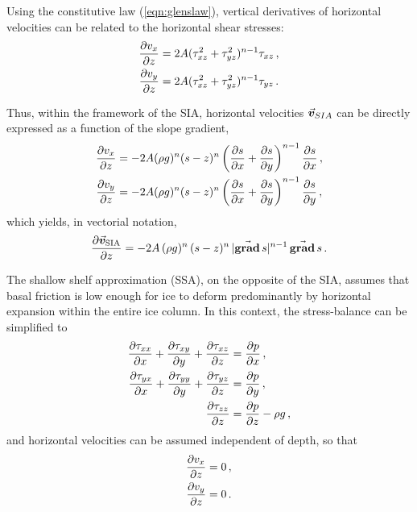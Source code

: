 \documentclass{article}
\newcommand{\vect}[1]{\va*{#1}} %
\renewcommand{\grad}[1]{\vect{\mathrm{grad}}\,#1}   %
\newcommand{\vv}[0]{\vect{v}}           %
\newcommand{\vsia}[0]{\vv_{\mathrm{SIA}}}   %
\begin{document}
Using the constitutive law (\ref{eqn:glenslaw}), vertical derivatives of
horizontal velocities can be related to the horizontal shear stresses:
\begin{subequations}
\begin{align}
    \pdv{v_x}{z} &= 2A (\tau_{xz}^2 + \tau_{yz}^2)^{n-1} \tau_{xz} \,, \\
    \pdv{v_y}{z} &= 2A (\tau_{xz}^2 + \tau_{yz}^2)^{n-1} \tau_{yz} \,.
\end{align}
\end{subequations}

Thus, within the framework of the SIA, horizontal velocities $\vv_{SIA}$ can be
directly expressed as a function of the slope gradient,
\begin{subequations}
\begin{align}
    \pdv{v_x}{z} &= -2A (\rho g)^n (s-z)^n
                    \left(\pdv{s}{x}+\pdv{s}{y}\right)^{n-1} \pdv{s}{x} \,, \\
    \pdv{v_y}{z} &= -2A (\rho g)^n (s-z)^n
                    \left(\pdv{s}{x}+\pdv{s}{y}\right)^{n-1} \pdv{s}{y} \,,
\end{align}
\end{subequations}
which yields, in vectorial notation,
\begin{equation}
    \label{eqn:vsia}
    \pdv{\vsia}{z} = -2A\,(\rho g)^n\,(s-z)^n\,|\grad{s}|^{n-1}\,\grad{s} \,.
\end{equation}

The shallow shelf approximation (SSA), on the opposite of the SIA, assumes that
basal friction is low enough for ice to deform predominantly by horizontal
expansion within the entire ice column. In this context, the stress-balance can
be simplified to
\begin{subequations}
\label{eqn:ssa}
\begin{align}
    \label{eqn:ssax}
    \pdv{\tau_{xx}}{x} + \pdv{\tau_{xy}}{y} + \pdv{\tau_{xz}}{z}
        &= \pdv{p}{x} \,, \\
    \label{eqn:ssay}
    \pdv{\tau_{yx}}{x} + \pdv{\tau_{yy}}{y} + \pdv{\tau_{yz}}{z}
        &= \pdv{p}{y} \,, \\
    \label{eqn:ssaz}
    \pdv{\tau_{zz}}{z} &= \pdv{p}{z} - \rho g \,,
\end{align}
\end{subequations}
and horizontal velocities can be assumed independent of depth, so that
\begin{align}
    \pdv{v_x}{z} &= 0 \,, \\
    \pdv{v_y}{z} &= 0 \,.
\end{align}
\end{document}
